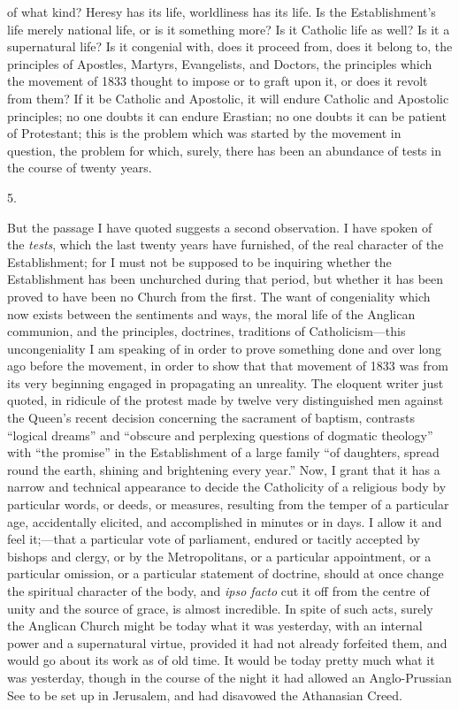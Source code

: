 of what kind? Heresy has its life, worldliness has its life. Is the
Establishment's life merely national life, or is it something more? Is
it Catholic life as well? Is it a supernatural life? Is it congenial
with, does it proceed from, does it belong to, the principles of
Apostles, Martyrs, Evangelists, and Doctors, the principles which the
movement of 1833 thought to impose or to graft upon it, or does it
revolt from them? If it be Catholic and Apostolic, it will endure Catholic and Apostolic principles; no one doubts it can endure
Erastian; no one doubts it can be patient of Protestant; this is the
problem which was started by the movement in question, the problem for
which, surely, there has been an abundance of tests in the course of
twenty years.

5.

But the passage I have quoted suggests a second observation. I have
spoken of the \emph{tests}, which the last twenty years have furnished, of
the real character of the Establishment; for I must not be supposed to
be inquiring whether the Establishment has been unchurched during that
period, but whether it has been proved to have been no Church from the
first. The want of congeniality which now exists between the
sentiments and ways, the moral life of the Anglican communion, and the
principles, doctrines, traditions of Catholicism—this uncongeniality
I am speaking of in order to prove something done and over long ago
before the movement, in order to show that that movement of 1833 was
from its very beginning engaged in propagating an unreality. The
eloquent writer just quoted, in ridicule of the protest made by twelve
very distinguished men against the Queen's recent decision concerning
the sacrament of baptism, contrasts ``logical dreams'' and
``obscure and perplexing questions of dogmatic theology'' with
``the promise'' in the Establishment of a large family
``of daughters, spread round the earth, shining and brightening
every year.'' Now, I grant that it has a narrow and technical
appearance to decide the Catholicity of a religious body by particular
words, or deeds, or measures, resulting from the temper of a
particular age, accidentally elicited, and accomplished in minutes or
in days. I allow it and feel it;—that a particular vote of
parliament, endured or tacitly accepted by bishops and clergy, or by
the Metropolitans, or a particular appointment, or a particular
omission, or a particular statement of doctrine, should at once change
the spiritual character of the body, and \emph{ipso facto} cut it off
from the centre of unity and the source of grace, is almost
incredible. In spite of such acts, surely the Anglican Church might be
today what it was yesterday, with an internal power and a supernatural
virtue, provided it had not already forfeited them, and would go about
its work as of old time. It would be today pretty much what it was
yesterday, though in the course of the night it had allowed an
Anglo-Prussian See to be set up in Jerusalem, and had disavowed the
Athanasian Creed.

